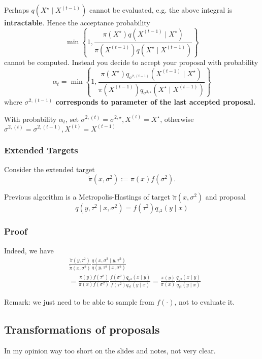 \documentclass{article}
\begin{document}
Perhaps $q\left(X^{\star} \mid X^{(t-1)}\right)$ cannot be evaluated, e.g. the above integral is \textbf{intractable}. Hence the acceptance probability
$$
\min \left\{1, \frac{\pi\left(X^{\star}\right) q\left(X^{(t-1)} \mid X^{\star}\right)}{\pi\left(X^{(t-1)}\right) q\left(X^{\star} \mid X^{(t-1)}\right)}\right\}
$$
cannot be computed.
Instead you decide to accept your proposal with probability
$$
\alpha_t=\min \left\{1, \frac{\pi\left(X^{\star}\right) q_{\sigma^{2,(t-1)}}\left(X^{(t-1)} \mid X^{\star}\right)}{\pi\left(X^{(t-1)}\right) q_{\sigma^{2, \star}}\left(X^{\star} \mid X^{(t-1)}\right)}\right\}
$$
where\textbf{ $\sigma^{2,(t-1)}$ corresponds to parameter of the last accepted proposal.}

With probability $\alpha_t$, set $\sigma^{2,(t)}=\sigma^{2, \star}, X^{(t)}=X^{\star}$, otherwise $\sigma^{2,(t)}=\sigma^{2,(t-1)}, X^{(t)}=X^{(t-1)}$

\subsubsection{Extended Targets}
Consider the extended target
$$
\tilde{\pi}\left(x, \sigma^2\right):=\pi(x) f\left(\sigma^2\right) .
$$

Previous algorithm is a Metropolis-Hastings of target $\tilde{\pi}\left(x, \sigma^2\right)$ and proposal
$$
q\left(y, \tau^2 \mid x, \sigma^2\right)=f\left(\tau^2\right) q_{\tau^2}(y \mid x)
$$
\subsubsection{Proof}
Indeed, we have
$$
\begin{aligned}
& \frac{\widetilde{\pi}\left(y, \tau^2\right)}{\widetilde{\pi}\left(x, \sigma^2\right)} \frac{q\left(x, \sigma^2 \mid y, \tau^2\right)}{q\left(y, \tau^2 \mid x, \sigma^2\right)} \\
& =\frac{\pi(y) f\left(\tau^2\right)}{\pi(x) f\left(\sigma^2\right)} \frac{f\left(\sigma^2\right) q_{\sigma^2}(x \mid y)}{f\left(\tau^2\right) q_{\tau^2}(y \mid x)}=\frac{\pi(y)}{\pi(x)} \frac{q_{\sigma^2}(x \mid y)}{q_{\tau^2}(y \mid x)}
\end{aligned}
$$

Remark: we just need to be able to sample from $f(\cdot)$, not to evaluate it.

\subsection{Transformations of proposals}
In my opinion way too short on the slides and notes, not very clear.
\end{document}
